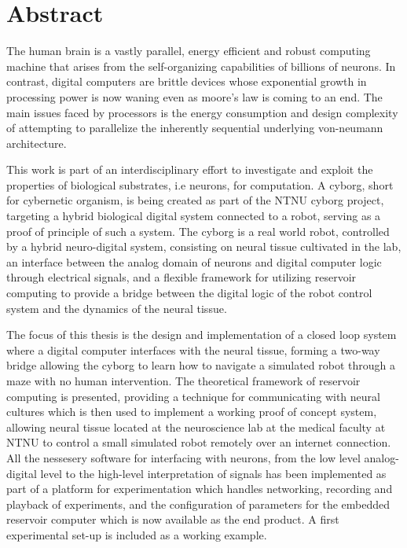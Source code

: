 \section*{\Huge Abstract}
The human brain is a vastly parallel, energy efficient and robust computing
machine that arises from the self-organizing capabilities of billions of neurons.
In contrast, digital computers are brittle devices whose exponential growth in
processing power is now waning even as moore's law is coming to an end.
The main issues faced by processors is the energy consumption and design
complexity of attempting to parallelize the inherently sequential underlying
von-neumann architecture.\par
This work is part of an interdisciplinary effort to investigate and exploit the
properties of biological substrates, i.e neurons, for computation.
%
A cyborg, short for cybernetic organism, is being created as part of the NTNU
cyborg project, targeting a hybrid biological digital system connected to a
robot, serving as a proof of principle of such a system.
%
The cyborg is a real world robot, controlled by a hybrid neuro-digital system,
consisting on neural tissue cultivated in the lab, an interface between the
analog domain of neurons and digital computer logic through electrical signals,
and a flexible framework for utilizing reservoir computing to provide a bridge
between the digital logic of the robot control system and the dynamics of the
neural tissue.\par
%
The focus of this thesis is the design and implementation of a closed loop
system where a digital computer interfaces with the neural tissue, forming a
two-way bridge allowing the cyborg to learn how to navigate a simulated robot
through a maze with no human intervention.
The theoretical framework of reservoir computing is presented, providing a technique
for communicating with neural cultures which is then used to implement a working
proof of concept system, allowing neural tissue located at the neuroscience lab
at the medical faculty at NTNU to control a small simulated robot remotely over an
internet connection.
All the nessesery software for interfacing with neurons, from the low level
analog-digital level to the high-level interpretation of signals has been
implemented as part of a platform for experimentation which handles networking,
recording and playback of experiments, and the configuration of parameters for
the embedded reservoir computer which is now available as the end product.
A first experimental set-up is included as a working example.
